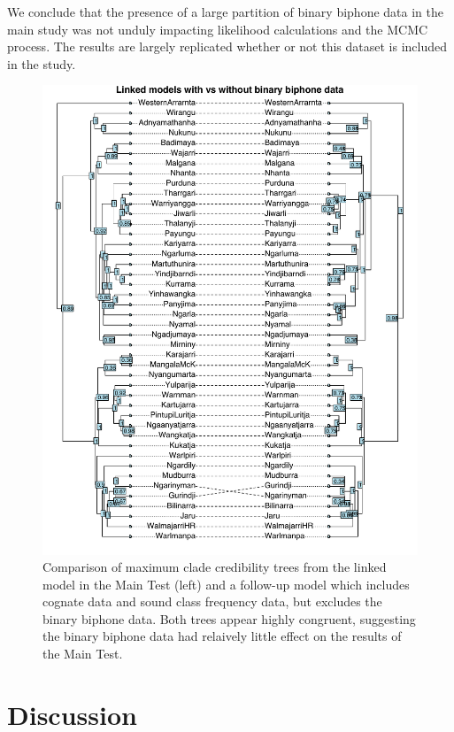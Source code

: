 \documentclass[]{article}
\begin{document}
We conclude that the presence of a large partition of binary biphone data in the main study was not unduly impacting likelihood calculations and the MCMC process. The results are largely replicated whether or not this dataset is included in the study.

\begin{figure}
\centering
\includegraphics{fig/linked_all_vs_linked.pdf}
\caption{\label{fig:linked-all-vs-linked}Comparison of maximum clade credibility trees from the linked model in the Main Test (left) and a follow-up model which includes cognate data and sound class frequency data, but excludes the binary biphone data. Both trees appear highly congruent, suggesting the binary biphone data had relaively little effect on the results of the Main Test.}
\end{figure}

\hypertarget{pn-tree-discussion}{%
\section{Discussion}\label{pn-tree-discussion}}
\end{document}

